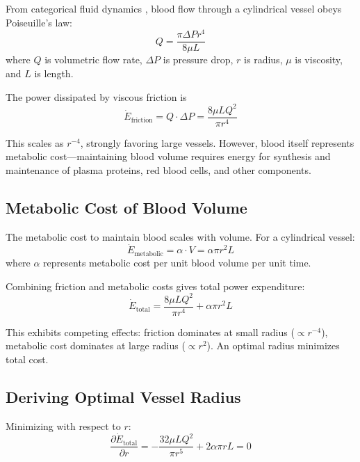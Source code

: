 \documentclass[10pt,twocolumn,a4paper]{article}
\theoremstyle{remark}
\begin{document}
From categorical fluid dynamics \cite{sachikonye2024fluid}, blood flow through a cylindrical vessel obeys Poiseuille's law:
\begin{equation}
Q = \frac{\pi \Delta P r^{4}}{8 \mu L}
\end{equation}
where $Q$ is volumetric flow rate, $\Delta P$ is pressure drop, $r$ is radius, $\mu$ is viscosity, and $L$ is length.

The power dissipated by viscous friction is
\begin{equation}
\dot{E}_{\mathrm{friction}} = Q \cdot \Delta P = \frac{8\mu L Q^{2}}{\pi r^{4}}
\end{equation}

This scales as $r^{-4}$, strongly favoring large vessels. However, blood itself represents metabolic cost—maintaining blood volume requires energy for synthesis and maintenance of plasma proteins, red blood cells, and other components.

\subsection{Metabolic Cost of Blood Volume}

The metabolic cost to maintain blood scales with volume. For a cylindrical vessel:
\begin{equation}
\dot{E}_{\mathrm{metabolic}} = \alpha \cdot V = \alpha \pi r^{2} L
\end{equation}
where $\alpha$ represents metabolic cost per unit blood volume per unit time.

Combining friction and metabolic costs gives total power expenditure:
\begin{equation}
\dot{E}_{\mathrm{total}} = \frac{8\mu L Q^{2}}{\pi r^{4}} + \alpha \pi r^{2} L
\end{equation}

This exhibits competing effects: friction dominates at small radius ($\propto r^{-4}$), metabolic cost dominates at large radius ($\propto r^{2}$). An optimal radius minimizes total cost.

\subsection{Deriving Optimal Vessel Radius}

Minimizing with respect to $r$:
\begin{equation}
\frac{\partial \dot{E}_{\mathrm{total}}}{\partial r} = -\frac{32\mu L Q^{2}}{\pi r^{5}} + 2\alpha \pi r L = 0
\end{equation}
\end{document}
